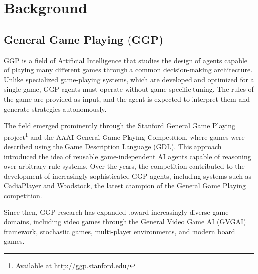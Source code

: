 \chapter{Background}
\label{Background}

\begin{abstract}
This chapter introduces the theoretical and technical background required for the remainder of the thesis. It first presents the main concepts related to General Game Playing and imperfect-information games, including determinization and simulation-based search methods. It then introduces the two frameworks studied in this work, TAG and Ludii, with a particular focus on their approaches to hidden-information handling and game-state simulation.
\end{abstract}

\section{General Game Playing (GGP)}
GGP\cite{Genesereth2005GeneralGP} is a field of Artificial Intelligence that studies the design of agents capable of playing many different games through a common decision-making architecture. Unlike specialized game-playing systems, which are developed and optimized for a single game, GGP agents must operate without game-specific tuning. The rules of the game are provided as input, and the agent is expected to interpret them and generate strategies autonomously.

The field emerged prominently through the \hyperlink{http://ggp.stanford.edu/}{Stanford General Game Playing project}\footnote{Available at \url{http://ggp.stanford.edu/}} and the AAAI General Game Playing Competition, where games were described using the Game Description Language (GDL)\cite{Love+al:2006}. This approach introduced the idea of reusable game-independent AI agents capable of reasoning over arbitrary rule systems. Over the years, the competition contributed to the development of increasingly sophisticated GGP agents, including systems such as CadiaPlayer\cite{finnsson2009cadiaplayer} and Woodstock, the latest champion of the General Game Playing competition\cite{koriche2017symmetry,koriche2017woodstock}.

Since then, GGP research has expanded toward increasingly diverse game domains, including video games through the General Video Game AI (GVGAI) framework\cite{Genesereth2005GeneralGP}, stochastic games, multi-player environments, and modern board games.

